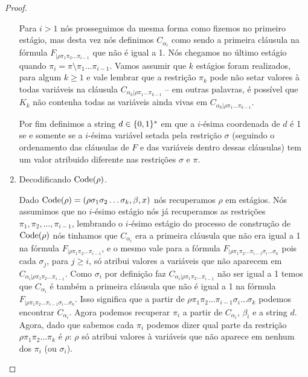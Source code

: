 \begin{proof}
\begin{enumerate}
	Para $i > 1$ nós prosseguimos da mesma forma como fizemos no primeiro estágio, mas desta vez nós definimos $C_{\alpha_{i}}$ como sendo a primeira cláusula na fórmula $F_{\lvert \rho\pi_{1}\pi_{2}\dots\pi_{i - 1}}$ que não é igual a 1. Nós chegamos no último estágio quando $\pi_{i} = \pi \setminus \pi_{1}\dots\pi_{i - 1}$. Vamos assumir que $k$ estágios foram realizados, para algum $k \geq 1$ e vale lembrar que a restrição $\pi_{k}$ pode não setar valores à todas variáveis na cláusula $C_{\alpha_{k} \lvert \rho\pi_{1}\dots\pi_{k - 1}}$ -- em outras palavras, é possível que $K_{k}$ não contenha todas as variáveis ainda vivas em $C_{\alpha_{k} \lvert \rho\pi_{1}\dots\pi_{k - 1}}$.
	
	Por fim definimos a string $d \in \{0, 1\}^{s}$ em que a $i$-ésima coordenada de $d$ é 1 se e somente se a $i$-ésima variável setada pela restrição $\sigma$ (seguindo o ordenamento das cláusulas de $F$ e das variáveis dentro dessas cláusulas) tem um valor atribuido diferente nas restrições $\sigma$ e $\pi$.

	\item Decodificando $\text{Code}(\rho)$.
	
	Dado $\text{Code}(\rho) = (\rho\sigma_{1}\sigma_{2}\dots\sigma_{k}, \beta, x)$ nós recuperamos $\rho$ em estágios. Nós assumimos que no $i$-ésimo estágio nós já recuperamos as restrições $\pi_{1}, \pi_{2}, \dots, \pi_{i - 1}$, lembrando o $i$-ésimo estágio do processo de construção de $\text{Code}(\rho)$ nós tinhamos que $C_{\alpha_{i}}$ era a primeira cláusula que não era igual a 1 na fórmula $F_{\lvert \rho\pi_{1}\pi_{2}\dots\pi_{i - 1}}$, e o mesmo vale para a fórmula $F_{\lvert \rho\pi_{1}\pi_{2}\dots\pi_{i - 1}\sigma_{i}\dots\sigma_{k}}$ pois cada $\sigma_{j}$, para $j \geq i$, só atribui valores a variáveis que não aparecem em $C_{\alpha_{i} \lvert \rho \pi_{1}\pi_{2}\dots\pi_{i - 1}}$. Como $\sigma_{i}$ por definição faz $C_{\alpha_{i} \lvert \rho\pi_{1}\pi_{2}\dots\pi_{i - 1}}$ não ser igual a 1 temos que $C_{\alpha_{i}}$ é também a primeira cláusula que não é igual a 1 na fórmula $F_{\lvert \rho\pi_{1}\pi_{2}\dots\pi_{i - 1}\sigma_{i}\dots\sigma_{k}}$. Isso significa que a partir de $\rho\pi_{1}\pi_{2}\dots\pi_{i - 1}\sigma_{i}\dots\sigma_{k}$ podemos encontrar $C_{\alpha_{i}}$. Agora podemos recuperar $\pi_{i}$ a partir de $C_{\alpha_{i}}$,  $\beta_{i}$ e a string $d$. Agora, dado que sabemos cada $\pi_{i}$ podemos dizer qual parte da restrição $\rho\pi_{1}\pi_{2}\dots\pi_{k}$ é $\rho$: $\rho$ só atribui valores à variáveis que não aparece em nenhum dos $\pi_{i}$ (ou $\sigma_{i}$).
	

\end{enumerate}
\end{proof}
